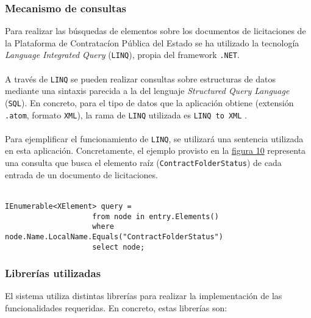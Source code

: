         \subsubsection{Mecanismo de consultas}
            Para realizar las búsquedas de elementos sobre los documentos de licitaciones de la Plataforma de Contratacíon Pública del Estado se ha utilizado la tecnología \textit{Language Integrated Query} (\texttt{LINQ}), propia del framework \texttt{.NET}.
            \\ \\
            A través de \texttt{LINQ} se pueden realizar consultas sobre estructuras de datos mediante una sintaxis parecida a la del lenguaje \textit{Structured Query Language} (\texttt{SQL}). En concreto, para el tipo de datos que la aplicación obtiene (extensión \texttt{.atom}, formato \texttt{XML}), la rama de \texttt{LINQ} utilizada es \texttt{LINQ to XML} \cite{LINQXML}.
            \\ \\
            Para ejemplificar el funcionamiento de \texttt{LINQ}, se utilizará una sentencia utilizada en esta aplicación. Concretamente, el ejemplo provisto en la \hyperref[fig:linq]{figura 10} representa una consulta que busca el elemento raíz (\texttt{ContractFolderStatus}) de cada entrada de un documento de licitaciones.
            \\ \\
            \begin{lstlisting}[language=lCSharp,gobble=14]
                IEnumerable<XElement> query =
                    from node in entry.Elements()
                    where node.Name.LocalName.Equals("ContractFolderStatus")
                    select node;
            \end{lstlisting}
            \label{fig:linq}
        
        \subsubsection{Librerías utilizadas} \label{subsubsec:libreria}
            El sistema utiliza distintas librerías para realizar la implementación de las funcionalidades requeridas. En concreto, estas librerías son:
            
